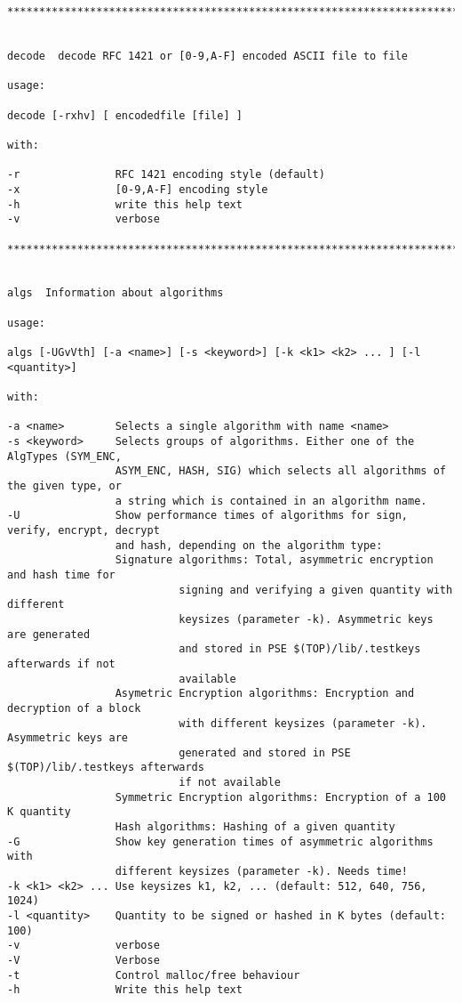 {\begin{verbatim}
****************************************************************************************


decode  decode RFC 1421 or [0-9,A-F] encoded ASCII file to file

usage:

decode [-rxhv] [ encodedfile [file] ]

with:

-r               RFC 1421 encoding style (default)
-x               [0-9,A-F] encoding style
-h               write this help text
-v               verbose

****************************************************************************************


algs  Information about algorithms

usage:

algs [-UGvVth] [-a <name>] [-s <keyword>] [-k <k1> <k2> ... ] [-l <quantity>]

with:

-a <name>        Selects a single algorithm with name <name>
-s <keyword>     Selects groups of algorithms. Either one of the AlgTypes (SYM_ENC, 
                 ASYM_ENC, HASH, SIG) which selects all algorithms of the given type, or
                 a string which is contained in an algorithm name.
-U               Show performance times of algorithms for sign, verify, encrypt, decrypt
                 and hash, depending on the algorithm type:
                 Signature algorithms: Total, asymmetric encryption and hash time for
                           signing and verifying a given quantity with different
                           keysizes (parameter -k). Asymmetric keys are generated
                           and stored in PSE $(TOP)/lib/.testkeys afterwards if not 
                           available
                 Asymetric Encryption algorithms: Encryption and decryption of a block
                           with different keysizes (parameter -k). Asymmetric keys are 
                           generated and stored in PSE $(TOP)/lib/.testkeys afterwards 
                           if not available
                 Symmetric Encryption algorithms: Encryption of a 100 K quantity
                 Hash algorithms: Hashing of a given quantity
-G               Show key generation times of asymmetric algorithms with
                 different keysizes (parameter -k). Needs time!
-k <k1> <k2> ... Use keysizes k1, k2, ... (default: 512, 640, 756, 1024)
-l <quantity>    Quantity to be signed or hashed in K bytes (default: 100)
-v               verbose
-V               Verbose
-t               Control malloc/free behaviour
-h               Write this help text


\end{verbatim}}

